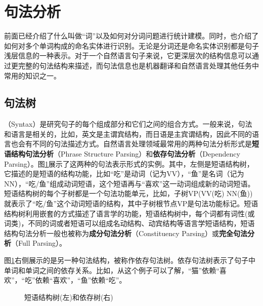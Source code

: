 \section{句法分析}

\parinterval 前面已经介绍了什么叫做“词”以及如何对分词问题进行统计建模。同时，也介绍了如何对多个单词构成的命名实体进行识别。无论是分词还是命名实体识别都是句子浅层信息的一种表示。对于一个自然语言句子来说，它更深层次的结构信息可以通过更完整的句法结构来描述，而句法信息也是机器翻译和自然语言处理其他任务中常用的知识之一。


\subsection{句法树}

（Syntax）是研究句子的每个组成部分和它们之间的组合方式。一般来说，句法和语言是相关的，比如，英文是主谓宾结构，而日语是主宾谓结构，因此不同的语言也会有不同的句法描述方式。自然语言处理领域最常用的两种句法分析形式是{\small\sffamily\bfseries{短语结构句法分析}}（Phrase Structure Parsing）和{\small\sffamily\bfseries{依存句法分析}}（Dependency Parsing）。图\ref{fig:3.4-1}展示了这两种的句法表示形式的实例。其中，左侧是短语结构树，它描述的是短语的结构功能，比如“吃”是动词（记为VV），“鱼”是名词（记为NN），“吃/鱼”组成动词短语，这个短语再与“喜欢”这一动词组成新的动词短语。短语结构树的每个子树都是一个句法功能单元，比如，子树VP(VV(吃) NN(鱼))就表示了“吃/鱼”这个动词短语的结构，其中子树根节点VP是句法功能标记。短语结构树利用嵌套的方式描述了语言学的功能，短语结构树中，每个词都有词性(或词类)，不同的词或者短语可以组成名动结构、动宾结构等语言学短语结构，短语结构句法分析一般也被称为{\small\sffamily\bfseries{成分句法分析}}（Constituency Parsing）或{\small\sffamily\bfseries{完全句法分析}}（Full Parsing）。

\parinterval 图\ref{fig:3.4-1}右侧展示的是另一种句法结构，被称作依存句法树。依存句法树表示了句子中单词和单词之间的依存关系。比如，从这个例子可以了解，“猫”依赖“喜欢”，“吃”依赖“喜欢”，“鱼”依赖“吃”。

\begin{figure}[htp]
    \centering

    \caption{短语结构树(左)和依存树(右)}
    \label{fig:3.4-1}
\end{figure}

